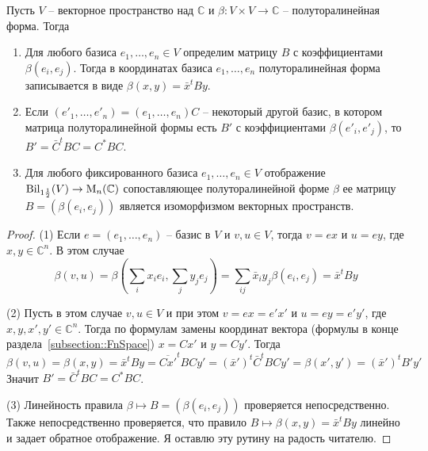 \begin{claim}
Пусть $V$ -- векторное пространство над $\mathbb C$ и $\beta \colon V\times V \to \mathbb C$ -- полуторалинейная форма.
Тогда
\begin{enumerate}
\item Для любого базиса $e_1,\ldots,e_n\in V$ определим матрицу $B$ с коэффициентами $\beta(e_i, e_j)$.
Тогда в координатах базиса $e_1,\ldots,e_n$ полуторалинейная форма записывается в виде $\beta(x, y) = \bar x^t B y$.

\item Если $(e'_1,\ldots,e'_n) = (e_1,\ldots,e_n)C$ -- некоторый другой базис, в котором матрица полуторалинейной формы есть $B'$ с коэффициентами $\beta(e'_i,e'_j)$, то $B' = \bar C^t B C = C^* B C$.

\item Для любого фиксированного базиса $e_1,\ldots,e_n\in V$ отображение $\operatorname{Bil}_{1\frac{1}{2}}(V)\to \operatorname{M}_n(\mathbb C)$ сопоставляющее полуторалинейной форме $\beta$ ее матрицу $B = (\beta(e_i,e_j))$ является изоморфизмом векторных пространств.
\end{enumerate}
\end{claim}
\begin{proof}
(1) Если $e = (e_1,\ldots,e_n)$ -- базис в $V$ и $v,u\in V$, тогда $v = ex$ и $u = ey$, где $x,y\in \mathbb C^n$.
В этом случае
\[
\beta(v,u) = \beta(\sum_i x_i e_i, \sum_j y_j e_j) = \sum_{ij}\bar x_i y_j \beta(e_i, e_j) = \bar x^t B y
\]

(2) Пусть в этом случае $v,u\in V$ и при этом $v = ex = e' x'$ и $u = ey = e'y'$, где $x,y,x',y'\in \mathbb C^n$.
Тогда по формулам замены координат вектора (формулы в конце раздела~\ref{subsection::FnSpace}) $x = Cx'$ и $y = Cy'$.
Тогда
\[
\beta(v,u) =\beta(x,y) = \bar x^t B y = \overline{Cx'}^t B C y' = (\bar x')^t \bar C^t B C y' = \beta(x',y') = (\bar x')^t B' y'
\]
Значит $B' = \bar C^t B C = C^* B C$.

(3) Линейность правила $\beta\mapsto B = (\beta(e_i, e_j))$ проверяется непосредственно.
Также непосредственно проверяется, что правило $B\mapsto \beta(x,y) = \bar x^t B y$ линейно и задает обратное отображение.
Я оставлю эту рутину на радость читателю.
\end{proof}

